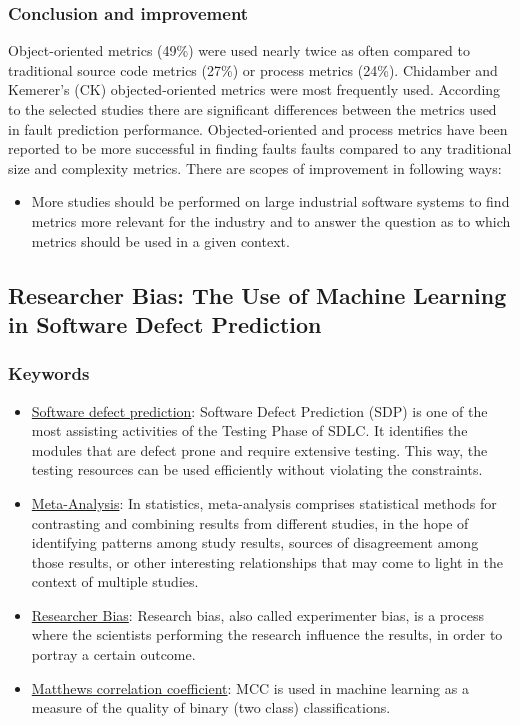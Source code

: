 \documentclass[conference]{IEEEtran}
\begin{document}
\subsubsection{\textbf{Conclusion and improvement}}
Object-oriented metrics (49\%) were used nearly twice as often compared to traditional source code metrics (27\%) or process metrics (24\%). Chidamber and Kemerer's (CK) objected-oriented metrics were most frequently used. According to the selected studies there are significant differences between the metrics used in fault prediction performance. Objected-oriented and process metrics have been reported to be more successful in finding faults faults compared to any traditional size and complexity metrics.
There are scopes of improvement in following ways:
\begin{itemize}
    \item More studies should be performed on large industrial software systems to find metrics more relevant for the industry and to answer the question as to which metrics should be used in a given context.
\end{itemize}

\subsection{\textbf{Researcher Bias: The Use of Machine Learning in Software Defect Prediction~\cite{shepperd2014researcher}}}
\subsubsection{\textbf{Keywords}}
\begin{itemize}
    \item \underline{Software defect prediction}: Software Defect Prediction (SDP) is one of the most assisting activities of the Testing Phase of SDLC. It identifies the modules that are defect prone and require extensive testing. This way, the testing resources can be used efficiently without violating the constraints.
    \item \underline{Meta-Analysis}: In statistics, meta-analysis comprises statistical methods for contrasting and combining results from different studies, in the hope of identifying patterns among study results, sources of disagreement among those results, or other interesting relationships that may come to light in the context of multiple studies.
    \item \underline{Researcher Bias}: Research bias, also called experimenter bias, is a process where the scientists performing the research influence the results, in order to portray a certain outcome.
    \item \underline{Matthews correlation coefficient}: MCC is used in machine learning as a measure of the quality of binary (two class) classifications.
\end{itemize}
\end{document}
